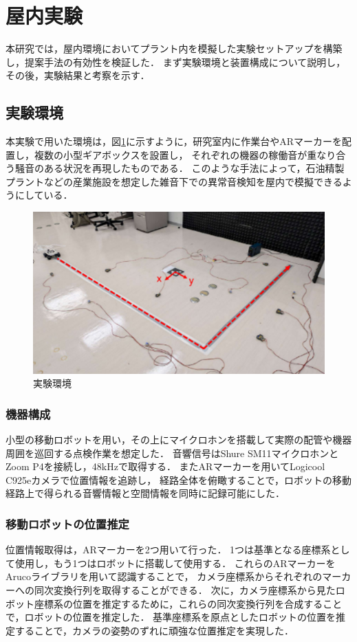 \documentclass[../main]{subfiles}
\begin{document}
\section{屋内実験} \label{sec:indoor_experiment}

本研究では，屋内環境においてプラント内を模擬した実験セットアップを構築し，提案手法の有効性を検証した．
まず実験環境と装置構成について説明し，その後，実験結果と考察を示す．

\subsection{実験環境} \label{subsec:vexp_ref_environmet}

本実験で用いた環境は，図\ref{fig:exp_setup}に示すように，研究室内に作業台やARマーカーを配置し，複数の小型ギアボックスを設置し，
それぞれの機器の稼働音が重なり合う騒音のある状況を再現したものである．
このような手法によって，石油精製プラントなどの産業施設を想定した雑音下での異常音検知を屋内で模擬できるようにしている．
\begin{figure}[t]
  \centering
  \includegraphics[keepaspectratio, width=0.7\linewidth]{chap4/env_experiment.png}
  \caption{実験環境}
  \label{fig:exp_setup}
\end{figure}


\subsubsection{機器構成} \label{subsubsec:device_config}

小型の移動ロボットを用い，その上にマイクロホンを搭載して実際の配管や機器周囲を巡回する点検作業を想定した．
音響信号はShure SM11マイクロホンとZoom P4を接続し，48kHzで取得する．
またARマーカーを用いてLogicool C925eカメラで位置情報を追跡し，
経路全体を俯瞰することで，ロボットの移動経路上で得られる音響情報と空間情報を同時に記録可能にした．

\subsubsection{移動ロボットの位置推定}
位置情報取得は，ARマーカーを2つ用いて行った．
1つは基準となる座標系として使用し，もう1つはロボットに搭載して使用する．
これらのARマーカーをArucoライブラリを用いて認識することで，
カメラ座標系からそれぞれのマーカーへの同次変換行列を取得することができる\cite{aruco2014}．
次に，カメラ座標系から見たロボット座標系の位置を推定するために，これらの同次変換行列を合成することで，ロボットの位置を推定した．
基準座標系を原点としたロボットの位置を推定することで，カメラの姿勢のずれに頑強な位置推定を実現した．
\end{document}
